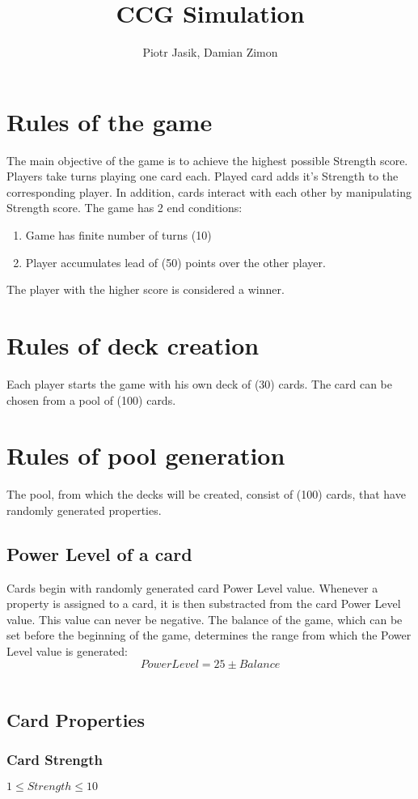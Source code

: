 \documentclass{article}
\title{CCG Simulation}
\author{Piotr Jasik, Damian Zimon}
\begin{document}
\maketitle
\section{Rules of the game}
    The main objective of the game is to achieve the highest possible Strength score. Players take turns playing one card each.
    Played card adds it's Strength to the corresponding player. In addition, cards interact with each other by manipulating Strength score. The game has 2 end conditions: 
    \begin{enumerate}
        \item Game has finite number of turns (10)
        \item Player accumulates lead of (50) points over the other player.
    \end{enumerate}
    The player with the higher score is considered a winner.
\section{Rules of deck creation}
    Each player starts the game with his own deck of (30) cards. The card can be chosen from a pool of (100) cards.
\section{Rules of pool generation}
    The pool, from which the decks will be created, consist of (100) cards, that have randomly generated properties.
\subsection{Power Level of a card}
    Cards begin with randomly generated card Power Level value.  Whenever a property is assigned to a card, it is then substracted from the card Power Level value. This value can never be negative. The balance of the game, which can be set before the beginning of the game, determines the range from which the Power Level value is generated:
    \begin{equation}
        Power Level = 25\pm Balance
    \end{equation}\\
\subsection{Card Properties}
\subsubsection{Card Strength}
    $1 \leq Strength \leq 10$
\end{document}
